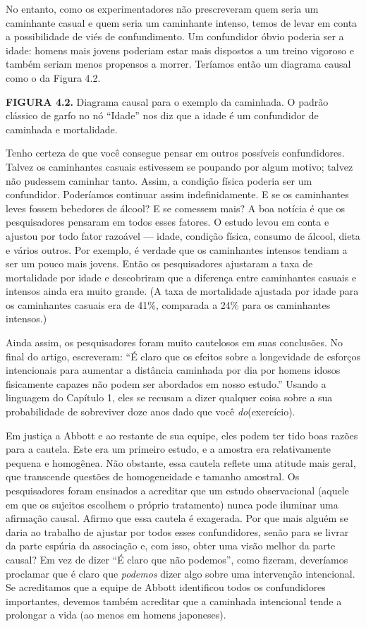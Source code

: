 \documentclass[11pt,a5paper,twoside]{book}
\begin{document}
No entanto, como os experimentadores não prescreveram quem seria um caminhante casual e quem seria um caminhante intenso, temos de levar em conta a possibilidade de viés de confundimento. Um confundidor óbvio poderia ser a idade: homens mais jovens poderiam estar mais dispostos a um treino vigoroso e também seriam menos propensos a morrer. Teríamos então um diagrama causal como o da Figura 4.2.

\textbf{FIGURA 4.2.} Diagrama causal para o exemplo da caminhada. O padrão clássico de garfo no nó “Idade” nos diz que a idade é um confundidor de caminhada e mortalidade.

Tenho certeza de que você consegue pensar em outros possíveis confundidores. Talvez os caminhantes casuais estivessem se poupando por algum motivo; talvez não pudessem caminhar tanto. Assim, a condição física poderia ser um confundidor. Poderíamos continuar assim indefinidamente. E se os caminhantes leves fossem bebedores de álcool? E se comessem mais? A boa notícia é que os pesquisadores pensaram em todos esses fatores. O estudo levou em conta e ajustou por todo fator razoável — idade, condição física, consumo de álcool, dieta e vários outros. Por exemplo, é verdade que os caminhantes intensos tendiam a ser um pouco mais jovens. Então os pesquisadores ajustaram a taxa de mortalidade por idade e descobriram que a diferença entre caminhantes casuais e intensos ainda era muito grande. (A taxa de mortalidade ajustada por idade para os caminhantes casuais era de 41\%, comparada a 24\% para os caminhantes intensos.)

Ainda assim, os pesquisadores foram muito cautelosos em suas conclusões. No final do artigo, escreveram: “É claro que os efeitos sobre a longevidade de esforços intencionais para aumentar a distância caminhada por dia por homens idosos fisicamente capazes não podem ser abordados em nosso estudo.” Usando a linguagem do Capítulo 1, eles se recusam a dizer qualquer coisa sobre a sua probabilidade de sobreviver doze anos dado que você \textit{do}(exercício).

Em justiça a Abbott e ao restante de sua equipe, eles podem ter tido boas razões para a cautela. Este era um primeiro estudo, e a amostra era relativamente pequena e homogênea. Não obstante, essa cautela reflete uma atitude mais geral, que transcende questões de homogeneidade e tamanho amostral. Os pesquisadores foram ensinados a acreditar que um estudo observacional (aquele em que os sujeitos escolhem o próprio tratamento) nunca pode iluminar uma afirmação causal. Afirmo que essa cautela é exagerada. Por que mais alguém se daria ao trabalho de ajustar por todos esses confundidores, senão para se livrar da parte espúria da associação e, com isso, obter uma visão melhor da parte causal? Em vez de dizer “É claro que não podemos”, como fizeram, deveríamos proclamar que é claro que \textit{podemos} dizer algo sobre uma intervenção intencional. Se acreditamos que a equipe de Abbott identificou todos os confundidores importantes, devemos também acreditar que a caminhada intencional tende a prolongar a vida (ao menos em homens japoneses).
\end{document}
